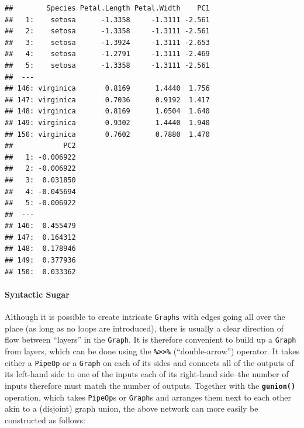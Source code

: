 \documentclass[]{article}
\newenvironment{Shaded}{\begin{snugshade}}{\end{snugshade}}
\newcommand{\DataTypeTok}[1]{\textcolor[rgb]{0.13,0.29,0.53}{#1}}
\newcommand{\DecValTok}[1]{\textcolor[rgb]{0.00,0.00,0.81}{#1}}
\newcommand{\KeywordTok}[1]{\textcolor[rgb]{0.13,0.29,0.53}{\textbf{#1}}}
\newcommand{\NormalTok}[1]{#1}
\newcommand{\OperatorTok}[1]{\textcolor[rgb]{0.81,0.36,0.00}{\textbf{#1}}}
\newcommand{\OtherTok}[1]{\textcolor[rgb]{0.56,0.35,0.01}{#1}}
\newcommand{\StringTok}[1]{\textcolor[rgb]{0.31,0.60,0.02}{#1}}
\let\oldparagraph\paragraph
\renewcommand{\paragraph}[1]{\oldparagraph{#1}\mbox{}}
\renewenvironment{Shaded} {\begin{snugshade}\small} {\end{snugshade}}
\begin{document}
\begin{verbatim}
##        Species Petal.Length Petal.Width    PC1
##   1:    setosa      -1.3358     -1.3111 -2.561
##   2:    setosa      -1.3358     -1.3111 -2.561
##   3:    setosa      -1.3924     -1.3111 -2.653
##   4:    setosa      -1.2791     -1.3111 -2.469
##   5:    setosa      -1.3358     -1.3111 -2.561
##  ---                                          
## 146: virginica       0.8169      1.4440  1.756
## 147: virginica       0.7036      0.9192  1.417
## 148: virginica       0.8169      1.0504  1.640
## 149: virginica       0.9302      1.4440  1.940
## 150: virginica       0.7602      0.7880  1.470
##            PC2
##   1: -0.006922
##   2: -0.006922
##   3:  0.031850
##   4: -0.045694
##   5: -0.006922
##  ---          
## 146:  0.455479
## 147:  0.164312
## 148:  0.178946
## 149:  0.377936
## 150:  0.033362
\end{verbatim}

\hypertarget{syntactic-sugar}{%
\paragraph{Syntactic Sugar}\label{syntactic-sugar}}

Although it is possible to create intricate \texttt{Graphs} with edges going all over the place (as long as no loops are introduced), there is usually a clear direction of flow between ``layers'' in the \texttt{Graph}.
It is therefore convenient to build up a \texttt{Graph} from layers, which can be done using the \textbf{\texttt{\%\textgreater{}\textgreater{}\%}} (``double-arrow'') operator.
It takes either a \texttt{PipeOp} or a \texttt{Graph} on each of its sides and connects all of the outputs of its left-hand side to one of the inputs each of its right-hand side--the number of inputs therefore must match the number of outputs.
Together with the \textbf{\texttt{gunion()}} operation, which takes \texttt{PipeOp}s or \texttt{Graph}s and arranges them next to each other akin to a (disjoint) graph union, the above network can more easily be constructed as follows:

\begin{Shaded}
\end{Shaded}
\end{document}
